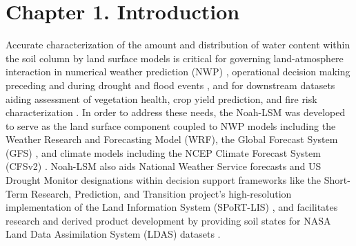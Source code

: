 
\chapter{Chapter 1. Introduction}%

Accurate characterization of the amount and distribution of water content within the soil column by land surface models is critical for governing land-atmosphere interaction in numerical weather prediction (NWP) \parencite{brocca_spatial-temporal_2010} \parencite{koster_contribution_2010}, operational decision making preceding and during drought and flood events \parencite{otkin_assessing_2016}, and for downstream datasets aiding assessment of vegetation health, crop yield prediction, and fire risk characterization \parencite{case_role_2023}. In order to address these needs, the Noah-LSM was developed to serve as the land surface component coupled to NWP models including the Weather Research and Forecasting Model (WRF), the Global Forecast System (GFS) \parencite{jin_sensitivity_2010} \parencite{mitchell_ncep_2005}, and climate models including the NCEP Climate Forecast System (CFSv2) \parencite{saha_ncep_2014}. Noah-LSM also aids National Weather Service forecasts and US Drought Monitor designations within decision support frameworks like the Short-Term Research, Prediction, and Transition project's high-resolution implementation of the Land Information System (SPoRT-LIS) \parencite{case_nasa_2022} \parencite{case_assessment_2014}, and facilitates research and derived product development by providing soil states for NASA Land Data Assimilation System (LDAS) datasets \parencite{ek_implementation_2003}.

